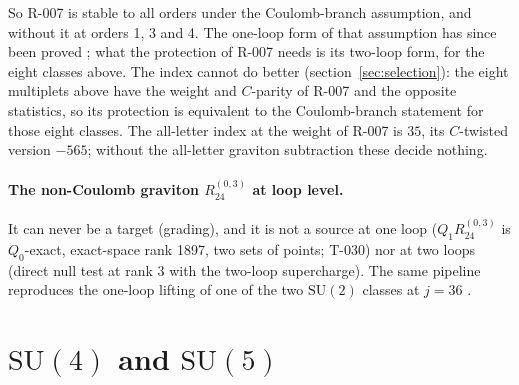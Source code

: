 \documentclass[11pt]{article}
\newcommand{\T}[1]{\textsf{T-0#1}}
\newcommand{\SU}{\mathrm{SU}}
\begin{document}
So R-007 is stable to all orders under the Coulomb-branch assumption, and without it at orders 1, 3 and 4. The
one-loop form of that assumption has since been proved \cite[sec.~6]{KVM}; what the protection of R-007 needs is its
two-loop form, for the eight classes above. The index
cannot do better (section~\ref{sec:selection}): the eight multiplets above have the weight and $C$-parity of R-007 and
the opposite statistics, so its protection is equivalent to the Coulomb-branch statement for those eight classes.
The all-letter index at the weight of R-007 is $35$, its $C$-twisted version $-565$; without the all-letter graviton
subtraction these decide nothing.

\paragraph{The non-Coulomb graviton $R_{24}^{(0,3)}$ at loop level.} It can never be a target (grading), and it is
not a source at one loop ($Q_1R_{24}^{(0,3)}$ is $Q_0$-exact, exact-space rank 1897, two sets of points; \T{30}) nor
at two loops (direct null test at rank 3 with the two-loop supercharge). The same pipeline reproduces the one-loop
lifting of one of the two $\SU(2)$ classes at $j=36$ \cite{KKLP}.

\section{$\SU(4)$ and $\SU(5)$}\label{sec:su4}
\end{document}
